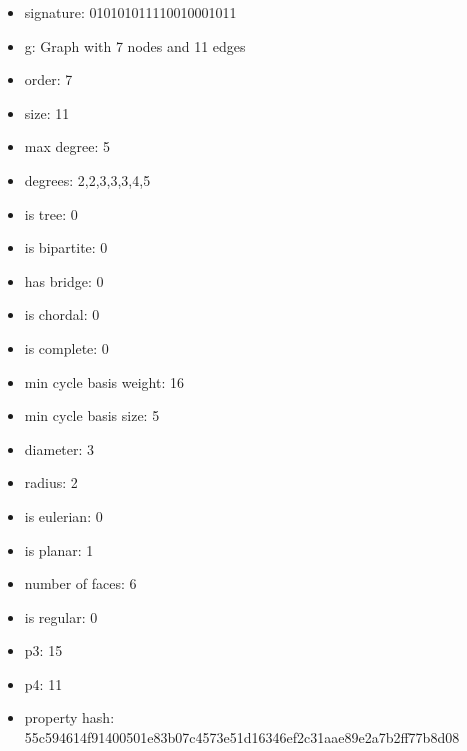 \begin{itemize}
\item signature: 010101011110010001011
\item g: Graph with 7 nodes and 11 edges
\item order: 7
\item size: 11
\item max degree: 5
\item degrees: 2,2,3,3,3,4,5
\item is tree: 0
\item is bipartite: 0
\item has bridge: 0
\item is chordal: 0
\item is complete: 0
\item min cycle basis weight: 16
\item min cycle basis size: 5
\item diameter: 3
\item radius: 2
\item is eulerian: 0
\item is planar: 1
\item number of faces: 6
\item is regular: 0
\item p3: 15
\item p4: 11
\item property hash: 55c594614f91400501e83b07c4573e51d16346ef2c31aae89e2a7b2ff77b8d08
\end{itemize}
\newpage
\begin{figure}
\end{figure}
